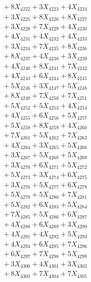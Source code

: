 \documentclass[a4paper,10pt]{article}
\begin{document}
{\begin{align}
&\;  + 8 X_{4222} + 3 X_{4223} + 4 X_{4224} \\[0.3ex]
&\;  + 3 X_{4225} + 8 X_{4226} + 8 X_{4227} \\[0.3ex]
&\;  + 3 X_{4228} + 7 X_{4229} + 4 X_{4230} \\[0.3ex]
&\;  + 4 X_{4231} + 4 X_{4232} + 4 X_{4233} \\[0.3ex]
&\;  + 3 X_{4234} + 7 X_{4235} + 8 X_{4236} \\[0.3ex]
&\;  + 8 X_{4237} + 4 X_{4238} + 3 X_{4239} \\[0.5ex]\allowbreak
&\;  + 4 X_{4240} + 8 X_{4241} + 7 X_{4242} \\[0.3ex]
&\;  + 4 X_{4243} + 6 X_{4244} + 8 X_{4245} \\[0.3ex]
&\;  + 5 X_{4246} + 3 X_{4247} + 5 X_{4248} \\[0.3ex]
&\;  + 8 X_{4249} + 7 X_{4250} + 7 X_{4251} \\[0.3ex]
&\;  + 5 X_{4252} + 5 X_{4253} + 4 X_{4254} \\[0.3ex]
&\;  + 4 X_{4255} + 6 X_{4256} + 5 X_{4257} \\[0.3ex]
&\;  + 5 X_{4258} + 8 X_{4259} + 4 X_{4260} \\[0.3ex]
&\;  + 7 X_{4261} + 5 X_{4262} + 7 X_{4263} \\[0.3ex]
&\;  + 4 X_{4264} + 3 X_{4265} + 5 X_{4266} \\[0.3ex]
&\;  + 3 X_{4267} + 5 X_{4268} + 5 X_{4269} \\[0.5ex]\allowbreak
&\;  + 3 X_{4270} + 6 X_{4271} + 5 X_{4272} \\[0.3ex]
&\;  + 5 X_{4273} + 3 X_{4274} + 6 X_{4275} \\[0.3ex]
&\;  + 3 X_{4276} + 5 X_{4277} + 6 X_{4278} \\[0.3ex]
&\;  + 5 X_{4279} + 5 X_{4280} + 7 X_{4281} \\[0.3ex]
&\;  + 5 X_{4282} + 6 X_{4283} + 5 X_{4284} \\[0.3ex]
&\;  + 7 X_{4285} + 5 X_{4286} + 6 X_{4287} \\[0.3ex]
&\;  + 4 X_{4288} + 6 X_{4289} + 3 X_{4290} \\[0.3ex]
&\;  + 4 X_{4291} + 4 X_{4292} + 5 X_{4293} \\[0.3ex]
&\;  + 4 X_{4294} + 6 X_{4295} + 7 X_{4296} \\[0.3ex]
&\;  + 6 X_{4297} + 7 X_{4298} + 5 X_{4299} \\[0.5ex]\allowbreak
&\;  + 3 X_{4300} + 4 X_{4301} + 3 X_{4302} \\[0.3ex]
&\;  + 8 X_{4303} + 7 X_{4304} + 7 X_{4305} \\[0.3ex]

\end{align}}
\end{document}

